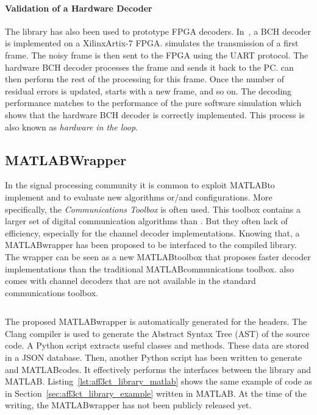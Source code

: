 \paragraph{Validation of a Hardware Decoder}

The \AFFECT library has also been used to prototype FPGA decoders.
In~\cite{Cassagne2017a}, a BCH decoder is implemented on a Xilinx\R Artix-7
FPGA. \AFFECT simulates the transmission of a first frame. The noisy frame is
then sent to the FPGA using the UART protocol. The hardware BCH decoder
processes the frame and sends it back to the PC. \AFFECT can then perform the
rest of the processing for this frame. Once the number of residual errors is
updated, \AFFECT starts with a new frame, and so on. The decoding performance
matches to the performance of the pure software simulation which shows that the
hardware BCH decoder is correctly implemented. This process is also known as
\emph{hardware in the loop}.

\subsection{MATLAB\R Wrapper}

In the signal processing community it is common to exploit MATLAB\R to implement
and to evaluate new algorithms or/and configurations. More specifically, the
\emph{Communications Toolbox} is often used. This toolbox contains a larger set
of digital communication algorithms than \AFFECT. But they often lack of
efficiency, especially for the channel decoder implementations. Knowing that, a
MATLAB\R wrapper has been proposed to be interfaced to the compiled \AFFECT
library. The wrapper can be seen as a new MATLAB\R toolbox that proposes faster
decoder implementations than the traditional MATLAB\R communications toolbox.
\AFFECT also comes with channel decoders that are not available in the standard
communications toolbox.

\begin{listing}[htp]
  \inputminted[frame=lines,linenos]{matlab}{\curChapter/src/use_cases/library/repetition_chain.m}
  \caption{Example of the \AFFECT MATLAB\R wrapper.}
  \label{lst:aff3ct_library_matlab}
\end{listing}

The proposed MATLAB\R wrapper is automatically generated for the \AFFECT
headers. The Clang compiler is used to generate the Abstract Syntax Tree (AST)
of the \AFFECT source code. A Python script extracts useful classes and methods.
These data are stored in a JSON database. Then, another Python script has been
written to generate \Cxx and MATLAB\R codes. It effectively performs the
interfaces between the \AFFECT library and MATLAB\R.
Listing~\ref{lst:aff3ct_library_matlab} shows the same example of code as in
Section~\ref{sec:aff3ct_library_example} written in MATLAB\R. At the time of the
writing, the MATLAB\R wrapper has not been publicly released yet.

